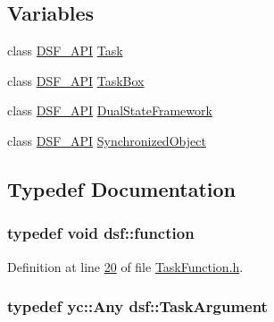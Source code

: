 \subsection*{Variables}
\begin{DoxyCompactItemize}
\item 
class \hyperlink{dsf_2_export_8h_ad7bb940831423512f29a6981786c37bd}{D\+S\+F\+\_\+\+A\+P\+I} \hyperlink{namespacedsf_a7df24c7d3d82e2e686aa3a524dc1dee9}{Task}
\item 
class \hyperlink{dsf_2_export_8h_ad7bb940831423512f29a6981786c37bd}{D\+S\+F\+\_\+\+A\+P\+I} \hyperlink{namespacedsf_ac3c92e2a98380dd728b0c18d0c495966}{Task\+Box}
\item 
class \hyperlink{dsf_2_export_8h_ad7bb940831423512f29a6981786c37bd}{D\+S\+F\+\_\+\+A\+P\+I} \hyperlink{namespacedsf_a68ac3b6a0526bfa7f6a412918afb1841}{Dual\+State\+Framework}
\item 
class \hyperlink{dsf_2_export_8h_ad7bb940831423512f29a6981786c37bd}{D\+S\+F\+\_\+\+A\+P\+I} \hyperlink{namespacedsf_acbf1798fc56cfb1707162a17e13f5fda}{Synchronized\+Object}
\end{DoxyCompactItemize}


\subsection{Typedef Documentation}
\hypertarget{namespacedsf_a3ad20407a44eaf5ce4cf784a60c1b92b}{}
\subsubsection[{function}]{\setlength{\rightskip}{0pt plus 5cm}typedef void {\bf dsf\+::function}}\label{namespacedsf_a3ad20407a44eaf5ce4cf784a60c1b92b}


Definition at line \hyperlink{_task_function_8h_source_l00020}{20} of file \hyperlink{_task_function_8h_source}{Task\+Function.\+h}.

\hypertarget{namespacedsf_abe4bf68433935a81c31a5ada9b17663a}{}
\subsubsection[{Task\+Argument}]{\setlength{\rightskip}{0pt plus 5cm}typedef {\bf yc\+::\+Any} {\bf dsf\+::\+Task\+Argument}}\label{namespacedsf_abe4bf68433935a81c31a5ada9b17663a}


